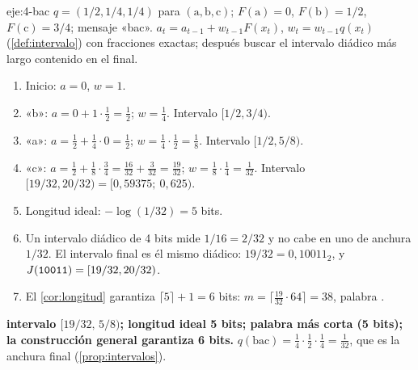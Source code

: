 \begin{solucion}{eje:4-bac}
\datos $q=(1/2,1/4,1/4)$ para $(\mathrm{a},\mathrm{b},\mathrm{c})$; $F(\mathrm{a})=0$, $F(\mathrm{b})=1/2$, $F(\mathrm{c})=3/4$; mensaje «bac».
\planteamiento $a_t=a_{t-1}+w_{t-1}F(x_t)$, $w_t=w_{t-1}q(x_t)$ (\cref{def:intervalo}) con fracciones exactas; después buscar el intervalo diádico más largo contenido en el final.
\pasos
\begin{enumerate}[label=\arabic*.]
  \item Inicio: $a=0$, $w=1$.
  \item «b»: $a=0+1\cdot\tfrac12=\tfrac12$; $w=\tfrac14$. Intervalo $[1/2,3/4)$.
  \item «a»: $a=\tfrac12+\tfrac14\cdot 0=\tfrac12$; $w=\tfrac14\cdot\tfrac12=\tfrac18$. Intervalo $[1/2,5/8)$.
  \item «c»: $a=\tfrac12+\tfrac18\cdot\tfrac34=\tfrac{16}{32}+\tfrac{3}{32}=\tfrac{19}{32}$; $w=\tfrac18\cdot\tfrac14=\tfrac1{32}$. Intervalo $[19/32,20/32)=[0{,}59375;\ 0{,}625)$.
  \item Longitud ideal: $-\log(1/32)=5$ bits.
  \item Un intervalo diádico de 4 bits mide $1/16=2/32$ y no cabe en uno de anchura $1/32$. El intervalo final es él mismo diádico: $19/32=0{,}10011_2$, y $J(\textnormal{\texttt{10011}})=[19/32,20/32)$.
  \item El \cref{cor:longitud} garantiza $\lceil 5\rceil+1=6$ bits: $m=\lceil\tfrac{19}{32}\cdot 64\rceil=38$, palabra .
\end{enumerate}
\resultado \textbf{intervalo $[19/32,\,5/8)$; longitud ideal 5 bits; palabra más corta  (5 bits); la construcción general garantiza 6 bits.}
\comprobacion $q(\text{bac})=\tfrac14\cdot\tfrac12\cdot\tfrac14=\tfrac1{32}$, que es la anchura final (\cref{prop:intervalos}).
\end{solucion}

